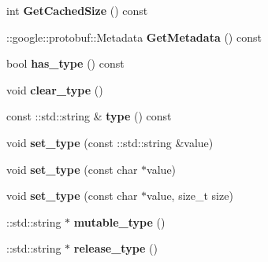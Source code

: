 \begin{DoxyCompactItemize}
\item 
int {\bfseries Get\+Cached\+Size} () const \hypertarget{classmachines_1_1Machine_a648152e9c2f16354f92ca10795e60597}{}\label{classmachines_1_1Machine_a648152e9c2f16354f92ca10795e60597}

\item 
\+::google\+::protobuf\+::\+Metadata {\bfseries Get\+Metadata} () const \hypertarget{classmachines_1_1Machine_a3421c3b065c0c0ca06f9b409511770fb}{}\label{classmachines_1_1Machine_a3421c3b065c0c0ca06f9b409511770fb}

\item 
bool {\bfseries has\+\_\+type} () const \hypertarget{classmachines_1_1Machine_a42b635e2648adf6cd3345b64cf91e822}{}\label{classmachines_1_1Machine_a42b635e2648adf6cd3345b64cf91e822}

\item 
void {\bfseries clear\+\_\+type} ()\hypertarget{classmachines_1_1Machine_ae9a2cbfcf6fc27cc8932715150bc08de}{}\label{classmachines_1_1Machine_ae9a2cbfcf6fc27cc8932715150bc08de}

\item 
const \+::std\+::string \& {\bfseries type} () const \hypertarget{classmachines_1_1Machine_ad12df0c21c6d063e3f0789840f7d1a7b}{}\label{classmachines_1_1Machine_ad12df0c21c6d063e3f0789840f7d1a7b}

\item 
void {\bfseries set\+\_\+type} (const \+::std\+::string \&value)\hypertarget{classmachines_1_1Machine_a1afeaa8b127c45f9cd438ae28391c5b3}{}\label{classmachines_1_1Machine_a1afeaa8b127c45f9cd438ae28391c5b3}

\item 
void {\bfseries set\+\_\+type} (const char $\ast$value)\hypertarget{classmachines_1_1Machine_aa03348ee860c5a2551c2ae286a1d63f1}{}\label{classmachines_1_1Machine_aa03348ee860c5a2551c2ae286a1d63f1}

\item 
void {\bfseries set\+\_\+type} (const char $\ast$value, size\+\_\+t size)\hypertarget{classmachines_1_1Machine_a1a82c2df5be926042e58923a008d7871}{}\label{classmachines_1_1Machine_a1a82c2df5be926042e58923a008d7871}

\item 
\+::std\+::string $\ast$ {\bfseries mutable\+\_\+type} ()\hypertarget{classmachines_1_1Machine_ac246c53f1de5a23ca0cdce8c5846a0f9}{}\label{classmachines_1_1Machine_ac246c53f1de5a23ca0cdce8c5846a0f9}

\item 
\+::std\+::string $\ast$ {\bfseries release\+\_\+type} ()\hypertarget{classmachines_1_1Machine_adcd1d15e61c2583c8060ab510117bb27}{}\label{classmachines_1_1Machine_adcd1d15e61c2583c8060ab510117bb27}


\end{DoxyCompactItemize}
